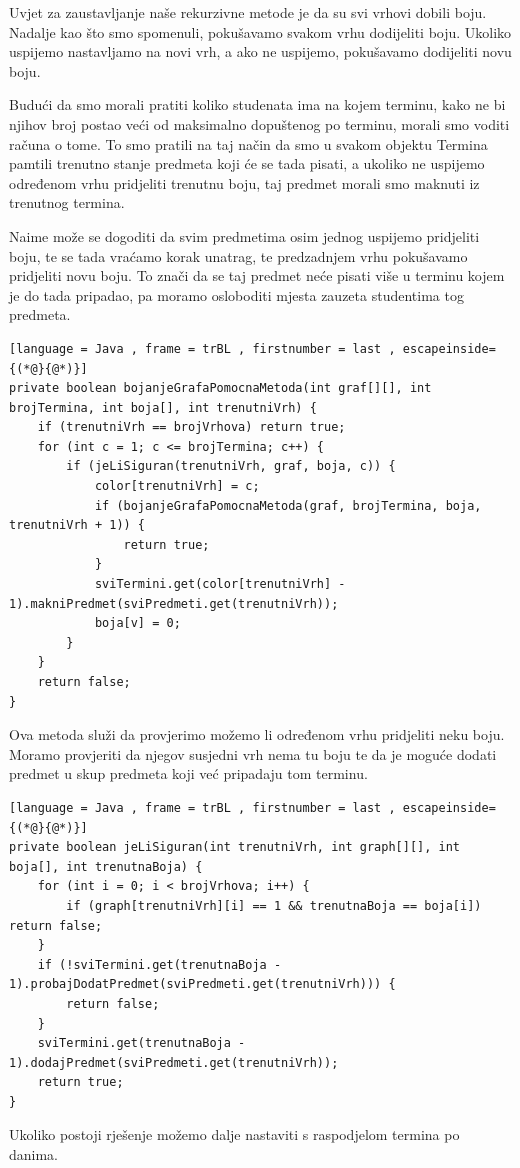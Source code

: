 \documentclass[times, utf8, zavrsni, numeric]{fer}
\begin{document}
Uvjet za zaustavljanje naše rekurzivne metode je da su svi vrhovi dobili boju. Nadalje kao što smo spomenuli, pokušavamo svakom vrhu dodijeliti boju. Ukoliko uspijemo nastavljamo na novi vrh, a ako ne uspijemo, pokušavamo dodijeliti novu boju.\par
Budući da smo morali pratiti koliko studenata ima na kojem terminu, kako ne bi njihov broj postao veći od maksimalno dopuštenog po terminu, morali smo voditi računa o tome. To smo pratili na taj način da smo u svakom objektu Termina pamtili trenutno stanje predmeta koji će se tada pisati, a ukoliko ne uspijemo određenom vrhu pridjeliti trenutnu boju, taj predmet morali smo maknuti iz trenutnog termina.\par
Naime može se dogoditi da svim predmetima osim jednog uspijemo pridjeliti boju, te se tada vraćamo korak unatrag, te predzadnjem vrhu pokušavamo pridjeliti novu boju. To znači da se taj predmet neće pisati više u terminu kojem je do tada pripadao, pa moramo osloboditi mjesta zauzeta studentima tog predmeta.
\newpage
\begin{lstlisting}[language = Java , frame = trBL , firstnumber = last , escapeinside={(*@}{@*)}]
private boolean bojanjeGrafaPomocnaMetoda(int graf[][], int brojTermina, int boja[], int trenutniVrh) {
	if (trenutniVrh == brojVrhova) return true;
	for (int c = 1; c <= brojTermina; c++) {
		if (jeLiSiguran(trenutniVrh, graf, boja, c)) {
			color[trenutniVrh] = c;
			if (bojanjeGrafaPomocnaMetoda(graf, brojTermina, boja, trenutniVrh + 1)) {
				return true;
			}
			sviTermini.get(color[trenutniVrh] - 1).makniPredmet(sviPredmeti.get(trenutniVrh));
			boja[v] = 0;
		}
	}
	return false;
}
\end{lstlisting}
\medskip
\par Ova metoda služi da provjerimo možemo li određenom vrhu pridjeliti neku boju. Moramo provjeriti da njegov susjedni vrh nema tu boju te da je moguće dodati predmet u skup predmeta koji već pripadaju tom terminu.
\medskip
\begin{lstlisting}[language = Java , frame = trBL , firstnumber = last , escapeinside={(*@}{@*)}]
private boolean jeLiSiguran(int trenutniVrh, int graph[][], int boja[], int trenutnaBoja) {
	for (int i = 0; i < brojVrhova; i++) {
		if (graph[trenutniVrh][i] == 1 && trenutnaBoja == boja[i]) return false;
	}
	if (!sviTermini.get(trenutnaBoja - 1).probajDodatPredmet(sviPredmeti.get(trenutniVrh))) {
		return false;
	}
	sviTermini.get(trenutnaBoja - 1).dodajPredmet(sviPredmeti.get(trenutniVrh));
	return true;
}
\end{lstlisting}
\medskip
Ukoliko postoji rješenje možemo dalje nastaviti s raspodjelom termina po danima.
 
\end{document}
